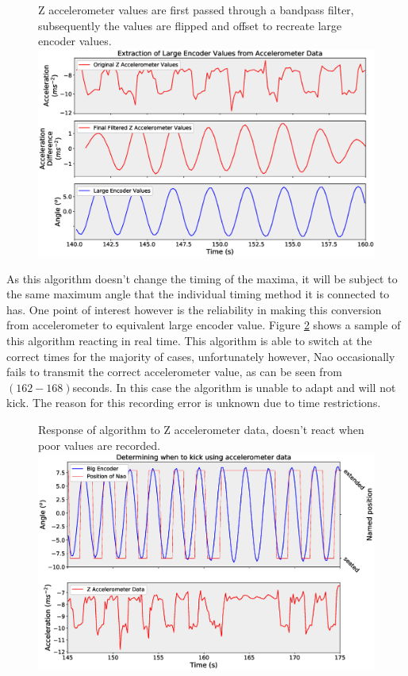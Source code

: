 \documentclass[11pt]{article}
\begin{document}
    \begin{figure}[!htb]
        \centering
        \captionbox
             {Z accelerometer values are first passed through a bandpass filter, subsequently the values are flipped and offset to recreate large encoder values.\label{fig:AccelerometerFiltering}}
             {\includegraphics[width=1.0\textwidth]{AccelerometerFiltering.eps}}
    \end{figure}
    
As this algorithm doesn't change the timing of the maxima, it will be subject to the same maximum angle that the individual timing method it is connected to has. One point of interest however is the reliability in making this conversion from accelerometer to equivalent large encoder value. Figure \ref{fig:PositionAccelerometer} shows a sample of this algorithm reacting in real time. This algorithm is able to switch at the correct times for the majority of cases, unfortunately however, Nao occasionally fails to transmit the correct accelerometer value, as can be seen from $(162-168)$seconds. In this case the algorithm is unable to adapt and will not kick. The reason for this recording error is unknown due to time restrictions.\\

    \begin{figure}[!htb]
        \centering
        \captionbox
             {Response of algorithm to Z accelerometer data, doesn't react when poor values are recorded.\label{fig:PositionAccelerometer}}
             {\includegraphics[width=1.0\textwidth]{PositionAccelerometer.eps}}
    \end{figure}
    
\end{document}
